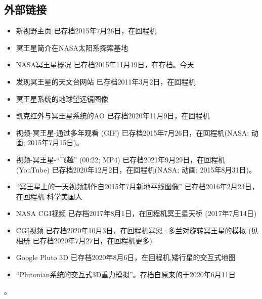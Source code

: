 \subsection{外部链接}
\begin{itemize}
\item 新视野主页 已存档2015年7月26日，在回程机
\item 冥王星简介在NASA太阳系探索基地
\item NASA冥王星概况 已存档2015年11月19日，在存档。今天
\item 发现冥王星的天文台网站 已存档2011年3月2日，在回程机
\item 冥王星系统的地球望远镜图像
\item 凯克红外与冥王星系统的AO 已存档2020年11月9日，在回程机
\item 视频-冥王星-通过多年观看 (GIF) 已存档2015年7月26日，在回程机(NASA; 动画; 2015年7月15日)。
\item 视频-冥王星-“飞越” (00:22; MP4) 已存档2021年9月29日，在回程机 (YouTube) 已存档2020年12月2日，在回程机(NASA; 动画; 2015年8月31日)。
\item “冥王星上的一天视频制作自2015年7月新地平线图像” 已存档2016年2月23日，在回程机 科学美国人
\item NASA CGI视频 已存档2017年8月1日，在回程机冥王星天桥 (2017年7月14日)
\item CGI视频 已存档2020年10月3日，在回程机塞恩·多兰对旋转冥王星的模拟 (见相册 已存档2020年7月27日，在回程机更多)
\item Google Pluto 3D 已存档2020年8月6日，在回程机,矮行星的交互式地图
\item “Plutonian系统的交互式3D重力模拟”。存档自原来的于2020年6月11日
\end{itemize}。
